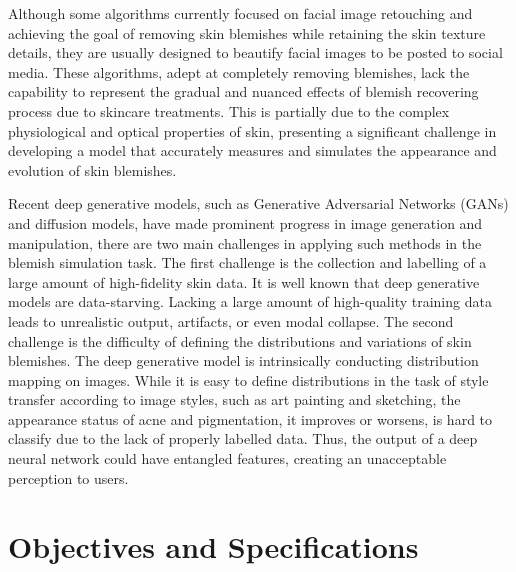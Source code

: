 \begin{spacing}{1.5}
Although some algorithms currently focused on facial image retouching and achieving the goal of removing skin blemishes while retaining the skin texture details, they are usually designed to beautify facial images to be posted to social media\cite{xieBlemishawareProgressiveFace2023, linExemplarbasedFreckleRetouching2019, shafaeiAutoRetouchAutomaticProfessional2021}. These algorithms, adept at completely removing blemishes, lack the capability to represent the gradual and nuanced effects of blemish recovering process due to skincare treatments. This is partially due to the complex physiological and optical properties of skin, presenting a significant challenge in developing a model that accurately measures and simulates the appearance and evolution of skin blemishes.

Recent deep generative models, such as Generative Adversarial Networks\cite{goodfellowGenerativeAdversarialNetworks2014} (GANs) and diffusion models\cite{DBLP:conf/nips/HoJA20,rombach2021highresolution}, have made prominent progress in image generation and manipulation, there are two main challenges in applying such methods in the blemish simulation task. The first challenge is the collection and labelling of a large amount of high-fidelity skin data. It is well known that deep generative models are data-starving. Lacking a large amount of high-quality training data leads to unrealistic output, artifacts, or even modal collapse. The second challenge is the difficulty of defining the distributions and variations of skin blemishes. The deep generative model is intrinsically conducting distribution mapping on images. While it is easy to define distributions in the task of style transfer\cite{DBLP:conf/iclr/DumoulinSK17,DBLP:conf/iccv/ZhuPIE17, DBLP:journals/corr/GatysEB15a} according to image styles, such as art painting and sketching, the appearance status of acne and pigmentation, it improves or worsens, is hard to classify due to the lack of properly labelled data. Thus, the output of a deep neural network could have entangled features, creating an unacceptable perception to users.


\section{Objectives and Specifications}


\end{spacing}
